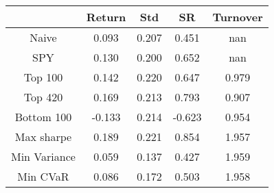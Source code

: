 \begin{table}[]
\begin{tabular}{ccccc}
\hline
             & Return   & Std      & SR       & Turnover \\ \hline
Naive        & 0.093 & 0.207 & 0.451 & nan \\
SPY          & 0.130 & 0.200 & 0.652 & nan \\
Top 100      & 0.142 & 0.220 & 0.647 & 0.979 \\
Top 420      & 0.169 & 0.213 & 0.793 & 0.907 \\
Bottom 100   & -0.133 & 0.214 & -0.623 & 0.954 \\
Max sharpe   & 0.189 & 0.221 & 0.854 & 1.957 \\
Min Variance & 0.059 & 0.137 & 0.427 & 1.959 \\
Min CVaR     & 0.086 & 0.172 & 0.503 & 1.958 \\
\hline
\end{tabular}
\end{table}